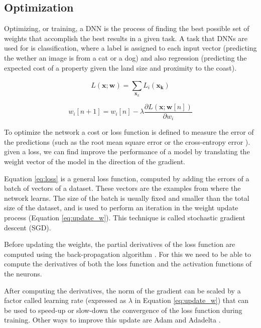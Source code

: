 \subsection{Optimization}

Optimizing, or training, a DNN is the process of finding the best possible set of weights that accomplish the best results in a given task. A task that DNNs are used for is classification, where a label is assigned to each input vector (predicting the wether an image is from a cat or a dog) and also regression (predicting the expected cost of a property given the land size and proximity to the coast).

\begin{equation}
    L(\mathbf{x}; \mathbf{w}) = \sum_{\mathbf{x}_k}^{} L_i (\mathbf{x_k})
    \label{eq:loss}
\end{equation}

\begin{equation}
    w_i[n+1] = w_i[n] - \lambda \frac{\partial L(\mathbf{x}; \mathbf{w}[n])}{\partial w_i}
    \label{eq:update_w}
\end{equation}

To optimize the network a cost or loss function is defined to measure the error of the predictions (such as the root mean square error or the cross-entropy error \cite{golik2013cross}). given a loss, we can find improve the performance of a model by translating the weight vector of the model in the direction of the gradient.

Equation \ref{eq:loss} is a general loss function, computed by adding the errors of a batch of vectors of a dataset. These vectors are the examples from where the network learns. The size of the batch is usually fixed and smaller than the total size of the dataset, and is used to perform an iteration in the weight update process (Equation \ref{eq:update_w}). This technique is called stochastic gradient descent \cite{bottou2010large} (SGD).

Before updating the weights, the partial derivatives of the loss function are computed using the back-propagation algorithm \cite{chauvin1995backpropagation}. For this we need to be able to compute the derivatives of both the loss function and the activation functions of the neurons.

After computing the derivatives, the norm of the gradient can be scaled by a factor called learning rate (expressed as $\lambda$ in Equation \ref{eq:update_w}) that can be used to speed-up or slow-down the convergence of the loss function during training. Other ways to improve this update are Adam \cite{kingma2014adam} and Adadelta \cite{zeiler2012adadelta}.

